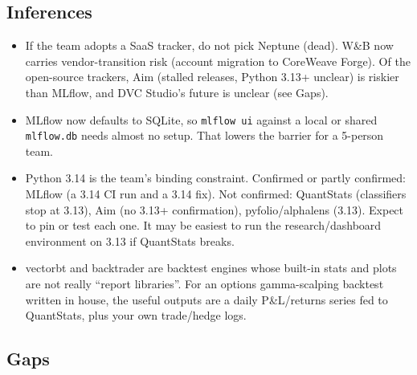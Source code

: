 \documentclass{article}
\begin{document}
\subsection{Inferences}

\begin{itemize}

\item If the team adopts a SaaS tracker, do not pick Neptune (dead). W\&B now carries vendor-transition risk (account migration to CoreWeave Forge). Of the open-source trackers, Aim (stalled releases, Python 3.13+ unclear) is riskier than MLflow, and DVC Studio's future is unclear (see Gaps).

\item MLflow now defaults to SQLite, so \texttt{mlflow ui} against a local or shared \texttt{mlflow.\allowbreak{}db} needs almost no setup. That lowers the barrier for a 5-person team.

\item Python 3.14 is the team's binding constraint. Confirmed or partly confirmed: MLflow (a 3.14 CI run and a 3.14 fix). Not confirmed: QuantStats (classifiers stop at 3.13), Aim (no 3.13+ confirmation), pyfolio/\allowbreak{}alphalens (3.13). Expect to pin or test each one. It may be easiest to run the research/\allowbreak{}dashboard environment on 3.13 if QuantStats breaks.

\item vectorbt and backtrader are backtest engines whose built-in stats and plots are not really ``report libraries''. For an options gamma-scalping backtest written in house, the useful outputs are a daily P\&L/\allowbreak{}returns series fed to QuantStats, plus your own trade/\allowbreak{}hedge logs.

\end{itemize}

\subsection{Gaps}
\end{document}
